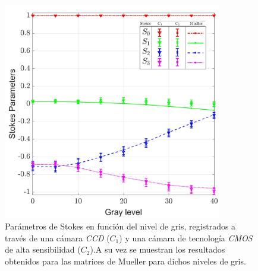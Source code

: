 \begin{figure}[h!]
\centering
\includegraphics[width=0.85\textwidth]{stokes.pdf}
\caption{Parámetros de Stokes en función del nivel de gris, registrados a través de una cámara {\it CCD} ($C_1$) y una cámara de tecnología {\it CMOS} de alta sensibilidad ($C_2$).A su vez se muestran los resultados obtenidos para las matrices de Mueller para dichos niveles de gris.}
\label{fig:stokes2}
\end{figure}






